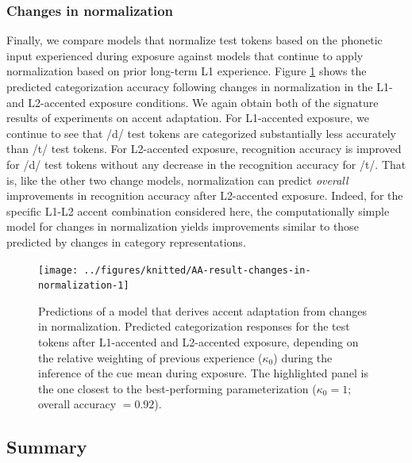 \documentclass[
  11pt,
  man,floatsintext]{apa6}
\begin{document}
\hypertarget{changes-in-normalization-1}{%
\subsubsection{Changes in normalization}\label{changes-in-normalization-1}}

Finally, we compare models that normalize test tokens based on the phonetic input experienced during exposure against models that continue to apply normalization based on prior long-term L1 experience. Figure \ref{fig:AA-result-changes-in-normalization} shows the predicted categorization accuracy following changes in normalization in the L1- and L2-accented exposure conditions. We again obtain both of the signature results of experiments on accent adaptation. For L1-accented exposure, we continue to see that /d/ test tokens are categorized substantially less accurately than /t/ test tokens. For L2-accented exposure, recognition accuracy is improved for /d/ test tokens without any decrease in the recognition accuracy for /t/. That is, like the other two change models, normalization can predict \emph{overall} improvements in recognition accuracy after L2-accented exposure. Indeed, for the specific L1-L2 accent combination considered here, the computationally simple model for changes in normalization yields improvements similar to those predicted by changes in category representations.



\begin{figure}

{\centering \texttt{[image: ../figures/knitted/AA-result-changes-in-normalization-1]} 

}

\caption{Predictions of a model that derives accent adaptation from changes in normalization. Predicted categorization responses for the test tokens after L1-accented and L2-accented exposure, depending on the relative weighting of previous experience (\(\kappa_0\)) during the inference of the cue mean during exposure. The highlighted panel is the one closest to the best-performing parameterization (\(\kappa_0 = 1\); overall accuracy \(=0.92\)).}\label{fig:AA-result-changes-in-normalization}
\end{figure}

\hypertarget{summary-1}{%
\subsection{Summary}\label{summary-1}}
\end{document}
